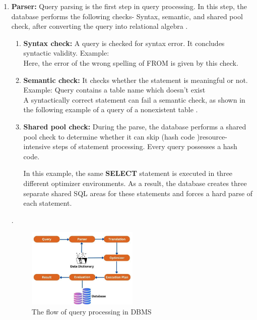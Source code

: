 \begin{enumerate}
\item \textbf{Parser:} Query parsing is the first step in query processing. In this step, the database performs the following checks- Syntax, semantic, and shared pool check, after converting the query into relational algebra \cite{wwwnaukricom-no-date}.
    \begin{enumerate}
        \item \textbf{Syntax check:} A query is checked for syntax error. It concludes syntactic validity. Example:\\
        
          Here, the error of the wrong spelling of FROM is given by this check.
        \item \textbf{Semantic check:} It checks whether the statement is meaningful or not. Example: Query contains a table name which doesn't exist\\
        
        A syntactically correct statement can fail a semantic check, as shown in the following example of a query of a nonexistent table \cite{Oracle}.
        \item \textbf{Shared pool check:} During the parse, the database performs a shared pool check to determine whether it can skip (hash code )resource-intensive steps of statement processing. Every query possesses a hash code.
        
        In this example, the same \textbf{SELECT} statement is executed in three different optimizer environments. As a result, the database creates three separate shared SQL areas for these statements and forces a hard parse of each statement.
    \end{enumerate}.\\
\begin{figure}[h]
    \centering
    \includegraphics[width=0.5\textwidth]{Figure/Query processing.jpg}
    \caption[The flow of query processing in DBMS]{The flow of query processing in DBMS \cite{Oracle}}
    \label{fig:my_image}
\end{figure}
    

\end{enumerate}
